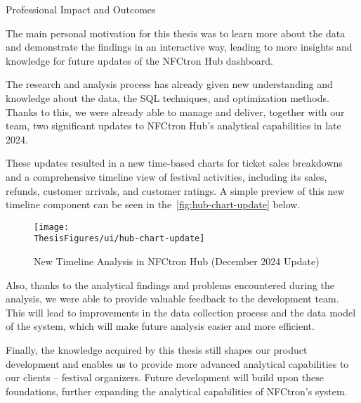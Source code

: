 \begin{section}{Professional Impact and Outcomes}
	\label{sec:future-impact}

	The main personal motivation for this thesis was to learn more about the data and demonstrate the findings in an interactive way, leading to more insights and knowledge for future updates of the NFCtron Hub dashboard.

	The research and analysis process has already given new understanding and knowledge about the data, the SQL techniques, and optimization methods.
	\\Thanks to this, we were already able to manage and deliver, together with our team, two significant updates to NFCtron Hub's analytical capabilities in late 2024.

	These updates resulted in a new time-based charts for ticket sales breakdowns and a comprehensive timeline view of festival activities, including its sales, refunds, customer arrivals, and customer ratings.
	A simple preview of this new timeline component can be seen in the~\autoref{fig:hub-chart-update} below.

	\begin{figure}[h]
		\centering
		\texttt{[image: \\ThesisFigures/ui/hub-chart-update]}
		\caption{New Timeline Analysis in NFCtron Hub (December 2024 Update)}
		\label{fig:hub-chart-update}
	\end{figure}

	Also, thanks to the analytical findings and problems encountered during the analysis, we were able to provide valuable feedback to the development team.
	This will lead to improvements in the data collection process and the data model of the system, which will make future analysis easier and more efficient.

	Finally, the knowledge acquired by this thesis still shapes our product development and enables us to provide more advanced analytical capabilities to our clients – festival organizers.
	Future development will build upon these foundations, further expanding the analytical capabilities of NFCtron's system.
\end{section}